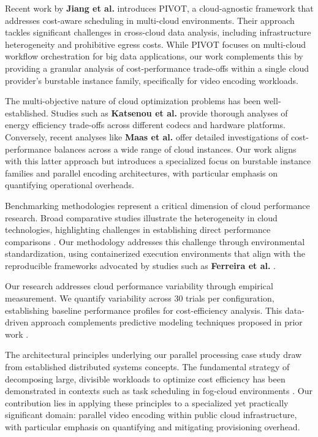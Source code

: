 \documentclass[conference]{IEEEtran}
\begin{document}
	Recent work by \textbf{Jiang et al.} \cite{b20} introduces PIVOT, a cloud-agnostic framework that addresses cost-aware scheduling in multi-cloud environments. Their approach tackles significant challenges in cross-cloud data analysis, including infrastructure heterogeneity and prohibitive egress costs. While PIVOT focuses on multi-cloud workflow orchestration for big data applications, our work complements this by providing a granular analysis of cost-performance trade-offs within a single cloud provider's burstable instance family, specifically for video encoding workloads.
	
	The multi-objective nature of cloud optimization problems has been well-established. Studies such as \textbf{Katsenou et al.} \cite{b8} provide thorough analyses of energy efficiency trade-offs across different codecs and hardware platforms. Conversely, recent analyses like \textbf{Maas et al.} \cite{b1} offer detailed investigations of cost-performance balances across a wide range of cloud instances. Our work aligns with this latter approach but introduces a specialized focus on burstable instance families and parallel encoding architectures, with particular emphasis on quantifying operational overheads.
	
	Benchmarking methodologies represent a critical dimension of cloud performance research. Broad comparative studies illustrate the heterogeneity in cloud technologies, highlighting challenges in establishing direct performance comparisons \cite{b18, b1}. Our methodology addresses this challenge through environmental standardization, using containerized execution environments that align with the reproducible frameworks advocated by studies such as \textbf{Ferreira et al.} \cite{b9}.
	
	Our research addresses cloud performance variability through empirical measurement. We quantify variability across 30 trials per configuration, establishing baseline performance profiles for cost-efficiency analysis. This data-driven approach complements predictive modeling techniques proposed in prior work \cite{b10, b11}.
	
	The architectural principles underlying our parallel processing case study draw from established distributed systems concepts. The fundamental strategy of decomposing large, divisible workloads to optimize cost efficiency has been demonstrated in contexts such as task scheduling in fog-cloud environments \cite{b12, b13}. Our contribution lies in applying these principles to a specialized yet practically significant domain: parallel video encoding within public cloud infrastructure, with particular emphasis on quantifying and mitigating provisioning overhead.
	
\end{document}
